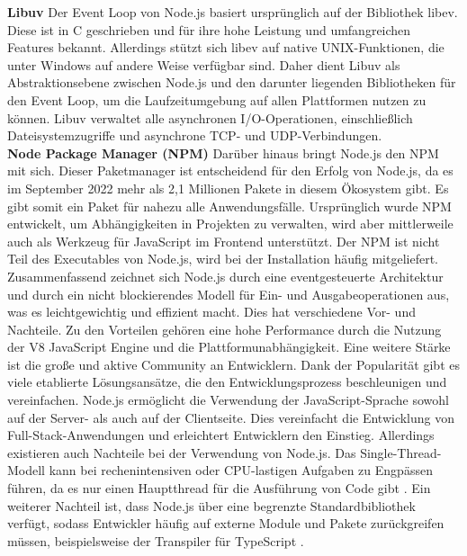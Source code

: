 \noindent
\textbf{Libuv} \newline
Der Event Loop von Node.js basiert ursprünglich auf der Bibliothek libev. Diese ist in C geschrieben und für ihre hohe Leistung und umfangreichen Features bekannt. Allerdings stützt sich libev auf native UNIX-Funktionen, die unter Windows auf andere Weise verfügbar sind. Daher dient Libuv als Abstraktionsebene zwischen Node.js und den darunter liegenden Bibliotheken für den Event Loop, um die Laufzeitumgebung auf allen Plattformen nutzen zu können. Libuv verwaltet alle asynchronen I/O-Operationen, einschließlich Dateisystemzugriffe und asynchrone TCP- und UDP-Verbindungen.\cite{Springer.2022} \\

\noindent
\textbf{Node Package Manager (NPM)} \newline
Darüber hinaus bringt Node.js den NPM mit sich. Dieser Paketmanager ist entscheidend für den Erfolg von Node.js, da es im September 2022 mehr als 2,1 Millionen Pakete in diesem Ökosystem gibt. Es gibt somit ein Paket für nahezu alle Anwendungsfälle. Ursprünglich wurde NPM entwickelt, um Abhängigkeiten in Projekten zu verwalten, wird aber mittlerweile auch als Werkzeug für JavaScript im Frontend unterstützt. Der NPM ist nicht Teil des Executables von Node.js, wird bei der Installation häufig mitgeliefert. \cite{Springer.2022, OpenJSFoundation.2022b}\\

\noindent
Zusammenfassend zeichnet sich Node.js durch eine eventgesteuerte Architektur und durch ein nicht blockierendes Modell für Ein- und Ausgabeoperationen aus, was es leichtgewichtig und effizient macht. Dies hat verschiedene Vor- und Nachteile. \newline
Zu den Vorteilen gehören eine hohe Performance durch die Nutzung der V8 JavaScript Engine und die Plattformunabhängigkeit. Eine weitere Stärke ist die große und aktive Community an Entwicklern. Dank der Popularität gibt es viele etablierte Lösungsansätze, die den Entwicklungsprozess beschleunigen und vereinfachen. Node.js ermöglicht die Verwendung der JavaScript-Sprache sowohl auf der Server- als auch auf der Clientseite. Dies vereinfacht die Entwicklung von Full-Stack-Anwendungen und erleichtert Entwicklern den Einstieg.\cite{Brown.November2019, OpenJSFoundation.2022b} \newline
Allerdings existieren auch Nachteile bei der Verwendung von Node.js. Das Single-Thread-Modell kann bei rechenintensiven oder CPU-lastigen Aufgaben zu Engpässen führen, da es nur einen Hauptthread für die Ausführung von Code gibt  \cite{Chhetri.2016}. Ein weiterer Nachteil ist, dass Node.js über eine begrenzte Standardbibliothek verfügt, sodass Entwickler häufig auf externe Module und Pakete zurückgreifen müssen, beispielsweise der Transpiler für TypeScript \cite{OpenJSFoundation.2022b}.

